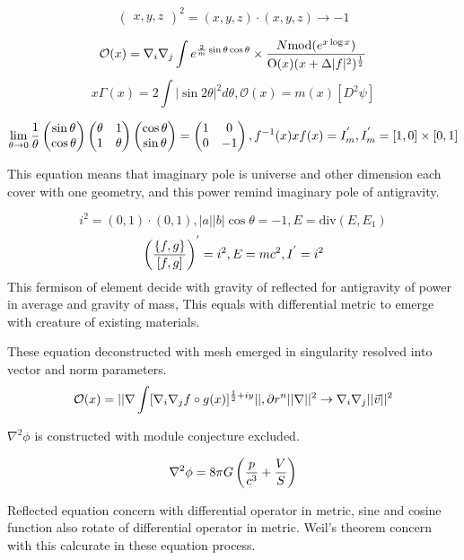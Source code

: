 \documentclass{jsarticle}
\begin{document}
 $${\begin{pmatrix} x,y,z
			    \end{pmatrix}}^2 = (x,y,z)\cdot(x,y,z) \to - 1 $$

$$ \mathcal{O}(x) = \nabla_{i}\nabla_{j} \int e^{{2 \over m}\sin \theta \cos \theta} \times {N \mathrm{mod}
	(e^{x \log x})
\over \mathrm{O}(x)(x + \Delta |f|^2)^{1 \over 2}} $$
	$$ x \Gamma(x) = 2 \int |\sin 2\theta|^2d\theta, \mathcal{O}(x) = m(x)[D^2\psi] $$
	
 $$ \lim_{\theta \to 0}{1 \over \theta} \begin{pmatrix} \sin \theta \\
			   \cos \theta \end{pmatrix} \begin{pmatrix} \theta & 1 \\
			   1 & \theta \end{pmatrix} \begin{pmatrix} \cos \theta \\
			   \sin \theta \end{pmatrix} =  \begin{pmatrix} 1 & 0 \\
			   0 & - 1 \end{pmatrix}, 
	f^{-1}(x) x f(x) = I^{'}_m, I^{'}_m = [1,0] \times [0,1] $$

	This equation means that imaginary pole is universe and other dimension each cover with one geometry,
and this power remind imaginary pole of antigravity.	

$$ i^2 = (0,1) \cdot (0,1),|a||b|\cos \theta = -1, E = \mathrm{div}(E,E_1) $$
$$ \left({\{f,g\} \over [f,g]}\right)^{'} = i^2,  E = mc^2, I^{'} = i^2 $$
This fermison of element decide with gravity of reflected for antigravity of power in average and gravity of mass,
This equals with differential metric to emerge with creature of existing materials.


  These equation deconstructed with mesh emerged in singularity resolved into vector and norm parameters.
$$ \mathcal{O}(x) = || \nabla \int [\nabla_{i}\nabla_{j} f \circ g(x)]^{{1 \over 2} + iy}|| , \partial r^n 
||\nabla||^2 \to \nabla_{i}\nabla_{j} ||\vec{v}||^2 $$

$ \nabla^2 \phi $ is constructed with module conjecture excluded.

$$ \nabla^2 \phi = 8 \pi G \left({p \over c^3} + {V \over S}\right) $$

  Reflected equation concern with differential operator in metric,
sine and cosine function also rotate of differential operator in metric.
Weil's theorem concern with this calcurate in these equation process.
\end{document}
